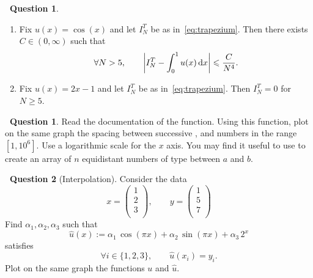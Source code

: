 \documentclass[11pt]{article}
\theoremstyle{definition}
\newtheorem{question}{{\normalfont \faGears}~Question}
\newtheorem{compexercise}{{\normalfont \faLaptop}~Question}
\begin{document}
\begin{question}
\begin{enumerate}
        \item
            Fix $u(x) = \cos(x)$ and let $I^T_N$ be as in~\eqref{eq:trapezium}.
            Then there exists $C \in (0, \infty)$ such that
            \[
                \forall N > 5, \qquad
                \left\lvert I^T_N - \int_{0}^1 u(x) \, \mathrm d x \right\rvert \leqslant \frac{C}{N^4}.
            \]

        \item
            Fix $u(x) = 2x - 1$ and let $I^T_N$ be as in~\eqref{eq:trapezium}.
            Then $I^T_N = 0$ for $N \geq 5$.
    \end{enumerate}
\end{question}

\newpage

\begin{compexercise}
    Read the documentation of the  function.
    Using this function,
    plot on the same graph the spacing between successive ,  and  numbers in the range $[1, 10^6]$.
    Use a logarithmic scale for the $x$ axis.
    You may find it useful to use 
    to create an array of $n$ equidistant numbers of type  between $a$ and $b$.
\end{compexercise}

\begin{compexercise}
    [Interpolation]
    Consider the data
    \[
        x =
        \begin{pmatrix}
            1 \\
            2 \\
            3 \\
        \end{pmatrix},
        \qquad
        y =
        \begin{pmatrix}
            1 \\
            5 \\
            7 \\
        \end{pmatrix}
    \]
    Find $\alpha_1, \alpha_2, \alpha_3$ such that
    \[
        \widehat u(x) := \alpha_1 \, \cos(\pi x) + \alpha_2 \, \sin(\pi x) + \alpha_3 \, 2^x
    \]
    satisfies
    \[
        \forall i \in \{1, 2, 3\}, \qquad
        \widehat u(x_i) = y_i.
    \]
    Plot on the same graph the functions $u$ and $\widehat u$.
\end{compexercise}
\end{document}

